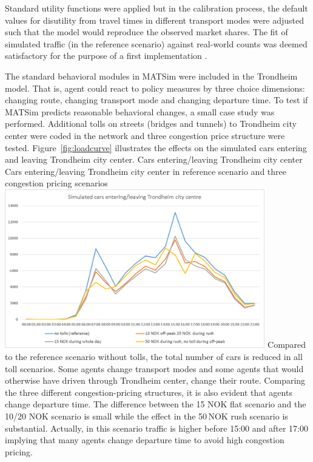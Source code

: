 Standard utility functions were applied but in the calibration process, the default values for disutility from travel times in different transport modes were adjusted such that the model would reproduce the observed market shares. The fit of simulated traffic (in the reference scenario) against real-world counts was deemed satisfactory for the purpose of a first implementation \citep[][]{Bockemuehl_TechRep_UH_2014}. 

The standard behavioral modules in MATSim were included in the Trondheim model. That is, agent could react to policy measures by three choice dimensions: changing route, changing transport mode and changing departure time. To test if MATSim predicts reasonable behavioral changes, a small case study was performed. Additional tolls on streets (bridges and tunnels) to Trondheim city center were coded in the network and three congestion price structure were tested. Figure~\ref{fig:loadcurve} illustrates the effects on the simulated cars entering and leaving Trondheim city center. 
%
\createfigure%
{Cars entering/leaving Trondheim city center}%
{Cars entering/leaving Trondheim city center in reference scenario and three congestion pricing scenarios \citep[source][]{Bockemuehl_TechRep_UH_2014}}%
{\label{fig:loadcurve}}%
{\includegraphics[width=0.85\textwidth, angle=0]{./using/figures/trondheimloadcurve.png}}%
{}
%
Compared to the reference scenario without tolls, the total number of cars is reduced in all toll scenarios. Some agents change transport modes and some agents that would otherwise have driven through Trondheim center, change their route. Comparing the three different congestion-pricing structures, it is also evident that agents change departure time. The difference between the 15 NOK flat scenario and the 10/20 NOK scenario is small while the effect in the 50\,NOK rush scenario is substantial. Actually, in this scenario traffic is higher before 15:00 and after 17:00 implying that many agents change departure time to avoid high congestion pricing.  











